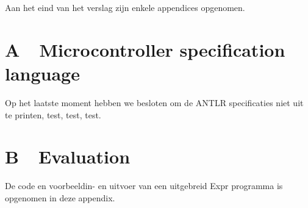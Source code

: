 \documentclass[a4paper]{article}
\begin{document}
{\sffamily
Aan het eind van het verslag zijn enkele appendices opgenomen. }

\section{}
\clearpage\section[A\ \ Microcontroller specification
language]{A\ \ Microcontroller specification language}
{\sffamily
Op het laatste moment hebben we besloten om de ANTLR specificaties niet
uit te printen, test, test, test.}

\clearpage\section[B\ \ Evaluation]{B\ \ Evaluation}
{\sffamily
De code en voorbeeldin- en uitvoer van een uitgebreid Expr programma is
opgenomen in deze appendix.}
\end{document}
